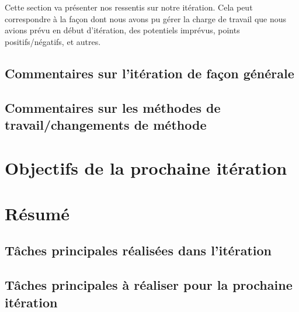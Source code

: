 \documentclass[12pt,titlepage,french]{article}
\begin{document}
Cette section va présenter nos ressentis sur notre itération. Cela peut correspondre à la façon dont nous avons pu gérer la charge de travail que nous avions prévu en début d'itération, des potentiels imprévus, points positifs/négatifs, et autres.

\subsection{Commentaires sur l'itération de façon générale}

\subsection{Commentaires sur les méthodes de travail/changements de méthode}


\section{Objectifs de la prochaine itération}


\section{Résumé}
\subsection{Tâches principales réalisées dans l'itération}

\subsection{Tâches principales à réaliser pour la prochaine itération}

\begin{thebibliography}{3}

\end{thebibliography}
\end{document}
